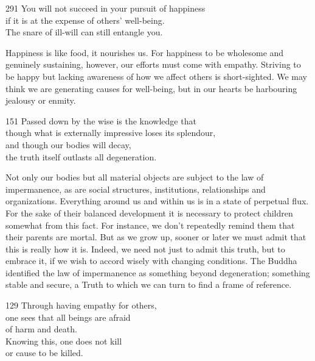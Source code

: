 
\begin{dhpVerse}{291}
\label{dhp-291}
You will not succeed in your pursuit of happiness\\
if it is at the expense of others' well-being.\\
The snare of ill-will can still entangle you. 
\end{dhpVerse}

\begin{dhpRefl}
  Happiness is like food, it nourishes us. For happiness to be wholesome and
  genuinely sustaining, however, our efforts must come with empathy. Striving to
  be happy but lacking awareness of how we affect others is short-sighted. We
  may think we are generating causes for well-being, but in our hearts be
  harbouring jealousy or enmity.
\end{dhpRefl}


\begin{dhpVerse}{151}
\label{dhp-151}
Passed down by the wise is the knowledge that\\
though what is externally impressive loses its splendour,\\
and though our bodies will decay,\\
the truth itself outlasts all degeneration.
\end{dhpVerse}

\begin{dhpRefl}
  Not only our bodies but all material objects are subject to the law of
  impermanence, as are social structures, institutions, relationships and
  organizations. Everything around us and within us is in a state of perpetual
  flux. For the sake of their balanced development it is necessary to protect
  children somewhat from this fact. For instance, we don't repeatedly remind
  them that their parents are mortal. But as we grow up, sooner or later we must
  admit that this is really how it is. Indeed, we need not just to admit this
  truth, but to embrace it, if we wish to accord wisely with changing
  conditions. The Buddha identified the law of impermanence as something beyond
  degeneration; something stable and secure, a Truth to which we can turn to
  find a frame of reference.
\end{dhpRefl}


\begin{dhpVerse}{129}
\label{dhp-129}
Through having empathy for others,\\
one sees that all beings are afraid\\
of harm and death.\\
Knowing this, one does not kill\\
or cause to be killed.
\end{dhpVerse}


